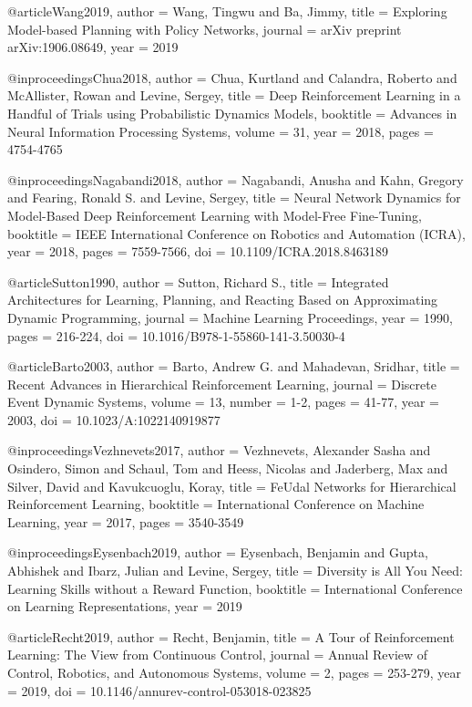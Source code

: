 @article{Wang2019,
  author = {Wang, Tingwu and Ba, Jimmy},
  title = {Exploring Model-based Planning with Policy Networks},
  journal = {arXiv preprint arXiv:1906.08649},
  year = {2019}
}

@inproceedings{Chua2018,
  author = {Chua, Kurtland and Calandra, Roberto and McAllister, Rowan and Levine, Sergey},
  title = {Deep Reinforcement Learning in a Handful of Trials using Probabilistic Dynamics Models},
  booktitle = {Advances in Neural Information Processing Systems},
  volume = {31},
  year = {2018},
  pages = {4754-4765}
}

@inproceedings{Nagabandi2018,
  author = {Nagabandi, Anusha and Kahn, Gregory and Fearing, Ronald S. and Levine, Sergey},
  title = {Neural Network Dynamics for Model-Based Deep Reinforcement Learning with Model-Free Fine-Tuning},
  booktitle = {IEEE International Conference on Robotics and Automation (ICRA)},
  year = {2018},
  pages = {7559-7566},
  doi = {10.1109/ICRA.2018.8463189}
}

@article{Sutton1990,
  author = {Sutton, Richard S.},
  title = {Integrated Architectures for Learning, Planning, and Reacting Based on Approximating Dynamic Programming},
  journal = {Machine Learning Proceedings},
  year = {1990},
  pages = {216-224},
  doi = {10.1016/B978-1-55860-141-3.50030-4}
}

@article{Barto2003,
  author = {Barto, Andrew G. and Mahadevan, Sridhar},
  title = {Recent Advances in Hierarchical Reinforcement Learning},
  journal = {Discrete Event Dynamic Systems},
  volume = {13},
  number = {1-2},
  pages = {41-77},
  year = {2003},
  doi = {10.1023/A:1022140919877}
}

@inproceedings{Vezhnevets2017,
  author = {Vezhnevets, Alexander Sasha and Osindero, Simon and Schaul, Tom and Heess, Nicolas and Jaderberg, Max and Silver, David and Kavukcuoglu, Koray},
  title = {FeUdal Networks for Hierarchical Reinforcement Learning},
  booktitle = {International Conference on Machine Learning},
  year = {2017},
  pages = {3540-3549}
}

@inproceedings{Eysenbach2019,
  author = {Eysenbach, Benjamin and Gupta, Abhishek and Ibarz, Julian and Levine, Sergey},
  title = {Diversity is All You Need: Learning Skills without a Reward Function},
  booktitle = {International Conference on Learning Representations},
  year = {2019}
}

@article{Recht2019,
  author = {Recht, Benjamin},
  title = {A Tour of Reinforcement Learning: The View from Continuous Control},
  journal = {Annual Review of Control, Robotics, and Autonomous Systems},
  volume = {2},
  pages = {253-279},
  year = {2019},
  doi = {10.1146/annurev-control-053018-023825}
}

